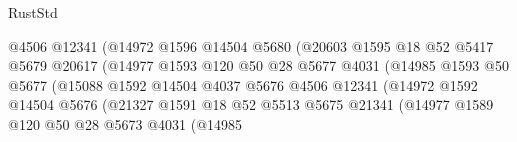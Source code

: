 \begin{lexlean}{RustStd}
\begin{coremodule}
                                      @4506
                                      @12341
                                      (@14972
                                        @1596
                                        @14504
                                        @5680
                                        (@20603
                                          @1595
                                          @18
                                          @52
                                          @5417
                                          @5679
                                          @20617
                                          (@14977
                                            @1593
                                            @120
                                            @50
                                            @28
                                            @5677
                                            @4031
                                            (@14985
                                              @1593
                                              @50
                                              @5677
                                              (@15088
                                                @1592
                                                @14504
                                                @4037
                                                @5676
                                                @4506
                                                @12341
                                                (@14972
                                                  @1592
                                                  @14504
                                                  @5676
                                                  (@21327
                                                    @1591
                                                    @18
                                                    @52
                                                    @5513
                                                    @5675
                                                    @21341
                                                    (@14977
                                                      @1589
                                                      @120
                                                      @50
                                                      @28
                                                      @5673
                                                      @4031
                                                      (@14985

\end{coremodule}
\end{lexlean}
